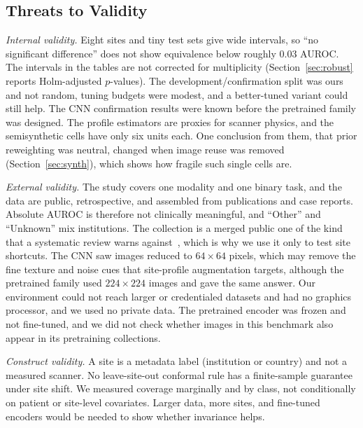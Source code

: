 \documentclass[journal]{IEEEtran}
\begin{document}
\subsection{Threats to Validity}
\emph{Internal validity.} Eight sites and tiny test sets give wide intervals, so ``no significant difference'' does not show equivalence below roughly $0.03$ AUROC. The intervals in the tables are not corrected for multiplicity (Section~\ref{sec:robust} reports Holm-adjusted $p$-values). The development/confirmation split was ours and not random, tuning budgets were modest, and a better-tuned variant could still help. The CNN confirmation results were known before the pretrained family was designed. The profile estimators are proxies for scanner physics, and the semisynthetic cells have only six units each. One conclusion from them, that prior reweighting was neutral, changed when image reuse was removed (Section~\ref{sec:synth}), which shows how fragile such single cells are.

\emph{External validity.} The study covers one modality and one binary task, and the data are public, retrospective, and assembled from publications and case reports. Absolute AUROC is therefore not clinically meaningful, and ``Other'' and ``Unknown'' mix institutions. The collection is a merged public one of the kind that a systematic review warns against~\cite{roberts2021common}, which is why we use it only to test site shortcuts. The CNN saw images reduced to $64\times64$ pixels, which may remove the fine texture and noise cues that site-profile augmentation targets, although the pretrained family used $224\times224$ images and gave the same answer. Our environment could not reach larger or credentialed datasets and had no graphics processor, and we used no private data. The pretrained encoder was frozen and not fine-tuned, and we did not check whether images in this benchmark also appear in its pretraining collections.

\emph{Construct validity.} A site is a metadata label (institution or country) and not a measured scanner. No leave-site-out conformal rule has a finite-sample guarantee under site shift. We measured coverage marginally and by class, not conditionally on patient or site-level covariates. Larger data, more sites, and fine-tuned encoders would be needed to show whether invariance helps.
\end{document}

